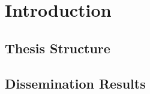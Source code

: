 

\chapter{Introduction}
\label{chap:intro}



\section{Thesis Structure}
\label{sec:thesisstructure}



\section{Dissemination Results}
\label{sec:disresults}



